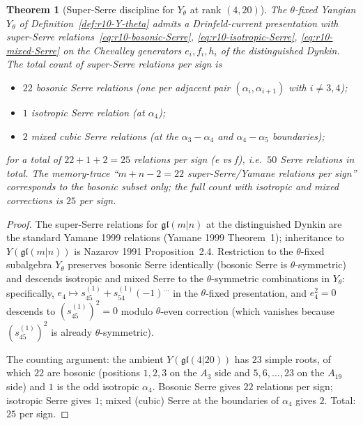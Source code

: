 \documentclass{article}
\providecommand{\fgl}{\mathfrak{gl}}
\newtheorem{theorem}{Theorem}
\theoremstyle{definition}
\begin{document}
\begin{theorem}[Super-Serre discipline for $Y_\theta$ at rank $(4, 20)$]
\label{thm:r10-super-Serre}
The $\theta$-fixed Yangian $Y_\theta$ of
Definition~\ref{def:r10-Y-theta} admits a Drinfeld-current
presentation with super-Serre relations~\eqref{eq:r10-bosonic-Serre},
\eqref{eq:r10-isotropic-Serre}, \eqref{eq:r10-mixed-Serre} on the
Chevalley generators $e_i, f_i, h_i$ of the distinguished Dynkin.
The total count of super-Serre relations per sign is
\begin{itemize}
\item $22$ bosonic Serre relations (one per adjacent pair
  $(\alpha_i, \alpha_{i+1})$ with $i \neq 3, 4$);
\item $1$ isotropic Serre relation (at $\alpha_4$);
\item $2$ mixed cubic Serre relations (at the $\alpha_3 - \alpha_4$
  and $\alpha_4 - \alpha_5$ boundaries);
\end{itemize}
for a total of $22 + 1 + 2 = 25$ relations per sign (e vs f), i.e.\
$50$ Serre relations in total. The memory-trace ``$m + n - 2 = 22$
super-Serre/Yamane relations per sign'' corresponds to the bosonic
subset only; the full count with isotropic and mixed corrections is
$25$ per sign.
\end{theorem}

\begin{proof}
The super-Serre relations for $\fgl(m|n)$ at the distinguished Dynkin
are the standard Yamane 1999 relations (Yamane 1999 Theorem~1);
inheritance to $Y(\fgl(m|n))$ is Nazarov 1991 Proposition~2.4.
Restriction to the $\theta$-fixed subalgebra $Y_\theta$ preserves
bosonic Serre identically (bosonic Serre is $\theta$-symmetric) and
descends isotropic and mixed Serre to the $\theta$-symmetric
combinations in $Y_\theta$: specifically, $e_4 \mapsto s^{(1)}_{45} +
s^{(1)}_{54} (-1)^{\ldots}$ in the $\theta$-fixed presentation, and
$e_4^2 = 0$ descends to $(s^{(1)}_{45})^2 = 0$ modulo $\theta$-even
correction (which vanishes because $(s^{(1)}_{45})^2$ is already
$\theta$-symmetric).

The counting argument: the ambient $Y(\fgl(4|20))$ has $23$ simple
roots, of which $22$ are bosonic (positions $1, 2, 3$ on the $A_3$ side
and $5, 6, \ldots, 23$ on the $A_{19}$ side) and $1$ is the odd
isotropic $\alpha_4$. Bosonic Serre gives $22$ relations per sign;
isotropic Serre gives $1$; mixed (cubic) Serre at the boundaries of
$\alpha_4$ gives $2$. Total: $25$ per sign.
\end{proof}
\end{document}
